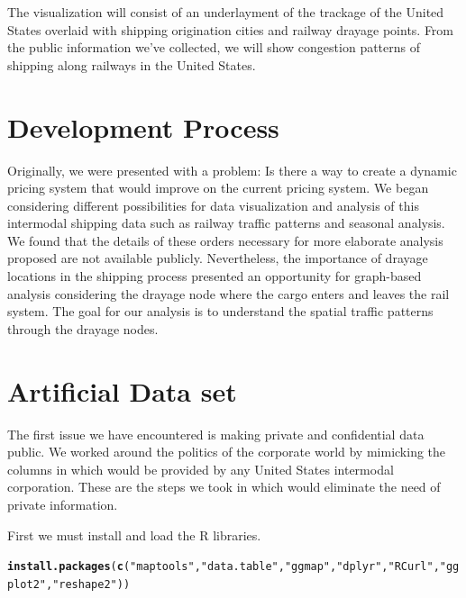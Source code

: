 \documentclass{article}\usepackage[]{graphicx}\usepackage[]{color}
\makeatletter
\newcommand{\hlstr}[1]{\textcolor[rgb]{0.192,0.494,0.8}{#1}}%
\newcommand{\hlstd}[1]{\textcolor[rgb]{0.345,0.345,0.345}{#1}}%
\newcommand{\hlkwd}[1]{\textcolor[rgb]{0.737,0.353,0.396}{\textbf{#1}}}%
\newenvironment{kframe}{%
 \def\at@end@of@kframe{}%
 \ifinner\ifhmode%
  \def\at@end@of@kframe{\end{minipage}}%
  \begin{minipage}{\columnwidth}%
 \fi\fi%
 \def\FrameCommand##1{\hskip\@totalleftmargin \hskip-\fboxsep
 \colorbox{shadecolor}{##1}\hskip-\fboxsep
     \hskip-\linewidth \hskip-\@totalleftmargin \hskip\columnwidth}%
 \MakeFramed {\advance\hsize-\width
   \@totalleftmargin\z@ \linewidth\hsize
   \@setminipage}}%
 {\par\unskip\endMakeFramed%
 \at@end@of@kframe}
\newenvironment{knitrout}{}{} %
\makeatother
\begin{document}
The visualization will consist of an underlayment of the trackage of the United States overlaid with shipping origination cities and railway drayage points. From the public information we've collected, we will show congestion patterns of shipping along railways in the United States.   \\

\section{Development Process} Originally, we were presented with a problem: Is there a way to create a dynamic pricing system that would improve on the current pricing system. We began considering different possibilities for data visualization and analysis of this intermodal shipping data such as railway traffic patterns and seasonal analysis. We found that the details of these orders necessary for more elaborate analysis proposed are not available publicly.  Nevertheless, the importance of drayage locations in the shipping process presented an opportunity for graph-based analysis considering the drayage node where the cargo enters and leaves the rail system.  The goal for our analysis is to understand the spatial traffic patterns through the drayage nodes.\\


\section{Artificial Data set} The first issue we have encountered is making private and confidential data public. We worked around the politics of the corporate world by mimicking the columns in which would be provided by any United States intermodal corporation. These are the steps we took in which would eliminate the need of private information.

First we must install and load the R libraries. \\


\begin{knitrout}
\color{fgcolor}\begin{kframe}
\begin{alltt}
\hlkwd{install.packages}\hlstd{(}\hlkwd{c}\hlstd{(}\hlstr{"maptools"}\hlstd{,} \hlstr{"data.table"}\hlstd{,} \hlstr{"ggmap"}\hlstd{,} \hlstr{"dplyr"}\hlstd{,} \hlstr{"RCurl"}\hlstd{,} \hlstr{"ggplot2"}\hlstd{,} \hlstr{"reshape2"}\hlstd{))}
\end{alltt}


{\ttfamily\noindent\itshape\color{messagecolor}{\#\# Installing packages into 'C:/Users/J/Documents/R/win-library/3.1'\\\#\# (as 'lib' is unspecified)}}

{\ttfamily\noindent\bfseries{}}\end{kframe}
\end{knitrout}
\end{document}
